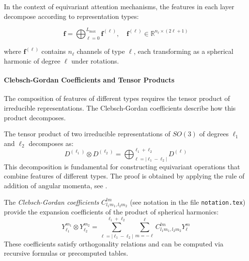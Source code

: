 In the context of equivariant attention mechanisms, the features in each layer decompose according to representation types:

\begin{equation}
    \mathbf{f} = \bigoplus_{\ell=0}^{L_{\max}} \mathbf{f}^{(\ell)}, \quad \mathbf{f}^{(\ell)} \in \mathbb{R}^{n_\ell \times (2\ell+1)}
    \label{eq:irrep_decomposition}
\end{equation}

where $\mathbf{f}^{(\ell)}$ contains $n_\ell$ channels of type $\ell$, each transforming as a spherical harmonic of degree $\ell$ under rotations.

\paragraph{Clebsch-Gordan Coefficients and Tensor Products}

The composition of features of different types requires the tensor product of irreducible representations. The Clebsch-Gordan coefficients describe how this product decomposes.

\begin{theorem}\label{thm:tensor_product_so3}
The tensor product of two irreducible representations of $SO(3)$ of degrees $\ell_1$ and $\ell_2$ decomposes as:
\begin{equation}
D^{(\ell_1)} \otimes D^{(\ell_2)} = \bigoplus_{\ell=|\ell_1-\ell_2|}^{\ell_1+\ell_2} D^{(\ell)}
\label{eq:tensor_product_decomposition_attention}
\end{equation}
This decomposition is fundamental for constructing equivariant operations that combine features of different types. The proof is obtained by applying the rule of addition of angular momenta, see \citep{brocker1985representations}.
\end{theorem}

\begin{definition}\label{def:clebsch_gordan_attention}
The \textit{Clebsch-Gordan coefficients} $C_{l_1 m_1, l_2 m_2}^{l m}$ (see notation in the file \texttt{notation.tex}) provide the expansion coefficients of the product of spherical harmonics:
\begin{equation}
Y_{\ell_1}^{m_1} \otimes Y_{\ell_2}^{m_2} = \sum_{\ell=|\ell_1-\ell_2|}^{\ell_1+\ell_2} \sum_{m=-\ell}^{\ell} C_{l_1 m_1, l_2 m_2}^{l m} Y_{\ell}^{m}
\label{eq:clebsch_gordan_expansion}
\end{equation}
These coefficients satisfy orthogonality relations and can be computed via recursive formulas or precomputed tables.
\end{definition}

